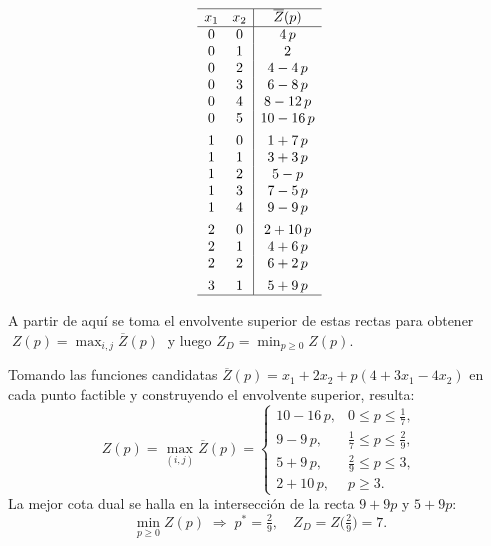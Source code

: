 \begin{enumerate}
    \[
      \begin{array}{cc|c}
        \hline
        x_{1} & x_{2} & \overline{Z}(p) \\ \hline
        0 & 0 & 4\,p              \\
        0 & 1 & 2                  \\
        0 & 2 & 4 - 4\,p          \\
        0 & 3 & 6 - 8\,p          \\
        0 & 4 & 8 -12\,p          \\
        0 & 5 & 10-16\,p          \\[4pt]
        1 & 0 & 1 + 7\,p          \\
        1 & 1 & 3 + 3\,p          \\
        1 & 2 & 5 -   p          \\
        1 & 3 & 7 - 5\,p          \\
        1 & 4 & 9 - 9\,p          \\[4pt]
        2 & 0 & 2 +10\,p          \\
        2 & 1 & 4 + 6\,p          \\
        2 & 2 & 6 + 2\,p          \\[4pt]
        3 & 1 & 5 + 9\,p          \\
        \hline
      \end{array}
    \]

    A partir de aquí se toma el envolvente superior de estas rectas para obtener
    \(\;Z(p)=\max_{i,j}\overline{Z}(p)\;\) y luego
    \(\displaystyle Z_{D}=\min_{p\ge0}Z(p)\).

Tomando las funciones candidatas \(\overline{Z}(p)=x_{1}+2x_{2}+p(4+3x_{1}-4x_{2})\)
    en cada punto factible y construyendo el envolvente superior, resulta:
    \[
      Z(p)
      = \max_{(i,j)}\overline{Z}(p)
      = 
      \begin{cases}
        10 - 16\,p, & 0 \le p \le \tfrac17,\\[0.3em]
        9 - 9\,p,   & \tfrac17 \le p \le \tfrac29,\\[0.3em]
        5 + 9\,p,   & \tfrac29 \le p \le 3,\\[0.3em]
        2 +10\,p,   & p \ge 3.
      \end{cases}
    \]
    La mejor cota dual se halla en la intersección de la recta $9+9p$ y $5+9p$:
    \[
      \min_{p\ge0}Z(p)
      \;\Longrightarrow\;
      p^* = \tfrac29,
      \quad Z_{D} = Z\bigl(\tfrac29\bigr) = 7.
    \]


\end{enumerate}

